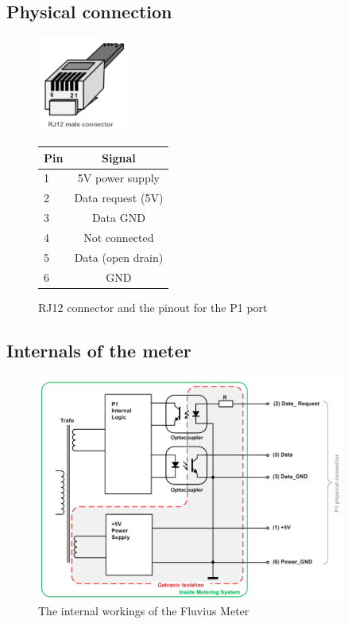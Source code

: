 \documentclass[a4paper,twoside, 12pt]{report}
\theoremstyle{break}
\begin{document}
\subsection{Physical connection}

\begin{figure}[!ht]
  \centering
  \includegraphics[width=3cm]{RJ12.png}
  \qquad
  \begin{tabular}{l|c} %
    \hline
    \textbf{Pin} & \textbf{Signal}   \\
    \hline
    1            & 5V power supply   \\
    2            & Data request (5V) \\
    3            & Data GND          \\
    4            & Not connected     \\
    5            & Data (open drain) \\
    6            & GND               \\
  \end{tabular}
  \captionsetup{labelformat=andtable}
  \caption{RJ12 connector and the pinout for the P1 port}
\end{figure}

\subsection{Internals of the meter}
\begin{figure}[H]
  \centering
  \includegraphics[width=0.9\textwidth]{MeterIntern.png}
  \caption{The internal workings of the Fluvius Meter}
\end{figure}
\end{document}
